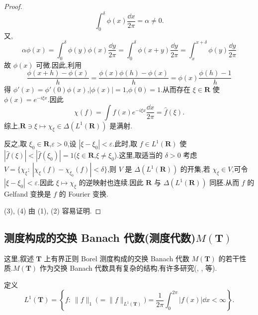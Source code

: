 \begin{proof}
\begin{equation*}
\int_{0}^{\delta}\phi(x)\frac{\dd x}{2\pi} = \alpha \neq 0.
\end{equation*}
又,
\begin{equation*}
\alpha\phi(x) = \int_{0}^{\delta}\phi(y)\phi(x)\frac{\dd y}{2\pi} = \int_{0}^{\delta}\phi(x + y)\frac{\dd y}{2\pi} = \int_{x}^{x + \delta}\phi(y)\frac{\dd y}{2\pi}
\end{equation*}
故 $\phi(x)$ 可微.因此,利用
\begin{equation*}
\frac{\phi(x + h) - \phi(x)}{h} = \frac{\phi(x)\phi(h) - \phi(x)}{h} = \phi(x)\frac{\phi(h) - 1}{h}
\end{equation*}
得 $\phi'(x) = \phi'(0)\phi(x)$,$|\phi(x)| = 1$,$\phi(0) = 1$.从而存在 $\xi \in \mathbf{R}$ 使 $\phi(x) = e^{-i\xi x}$.因此
\begin{equation*}
\chi(f) = \int f(x)e^{-i\xi x}\frac{\dd x}{2\pi} = \hat{f}(\xi).
\end{equation*}
综上,$\mathbf{R} \ni \xi \mapsto \chi_{\xi} \in \Delta(L^{1}(\mathbf{R}))$ 是满射.

反之,取 $\xi_{0} \in \mathbf{R}$,$\varepsilon > 0$,设 $|\xi - \xi_{0}| < \varepsilon$.此时,取 $f \in L^{1}(\mathbf{R})$ 使 $|\hat{f}(\xi)| < |\hat{f}(\xi_{0})| = 1$($\xi \in \mathbf{R}$,$\xi \neq \xi_{0}$).这里,取适当的 $\delta > 0$ 考虑 $V = \{\chi_{\xi}:\ |\chi_{\xi}(f) - \chi_{\xi_{0}}(f)| < \delta\}$,则 $V$ 是 $\Delta(L^{1}(\mathbf{R}))$ 的开集,若 $\chi_{\xi} \in V$,可令 $|\xi - \xi_{0}| < \varepsilon$.因此 $\xi \mapsto \chi_{\xi}$ 的逆映射也连续.因此 $\mathbf{R}$ 与 $\Delta(L^{1}(\mathbf{R}))$ 同胚.从而 $f$ 的 Gelfand 变换是 $f$ 的 Fourier 变换.

(3), (4) 由 (1), (2) 容易证明.
\end{proof}

\subsection{\texorpdfstring{测度构成的交换 Banach 代数(测度代数)$M(\mathbf{T})$}{测度构成的交换 Banach 代数(测度代数)M(T)}}\label{sec:3.2.3}

这里,叙述 $\mathbf{T}$ 上有界正则 Borel 测度构成的交换 Banach 代数 $M(\mathbf{T})$ 的若干性质.$M(\mathbf{T})$ 作为交换 Banach 代数具有复杂的结构,有许多研究(\cite{ch3:2}, \cite{ch3:12}, \cite{ch3:13} 等).

定义
\begin{equation*}
L^{1}(\mathbf{T}) = \left\{f:\ \|f\|_{1}\ \bigl(= \|f\|_{L^{1}(\mathbf{T})}\bigr) = \frac{1}{2\pi}\int_{0}^{2\pi}|f(x)|\dd x < \infty\right\}.
\end{equation*}

